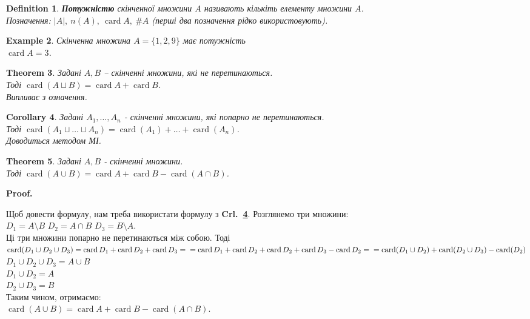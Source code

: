 \documentclass[a4paper, 14pt]{extarticle}
\makeatletter
\theoremstyle{theoremdd}
\newtheorem{theorem}{Theorem}[subsection]
\theoremstyle{theoremdd}
\newtheorem{definition}[theorem]{Definition}
\theoremstyle{theoremdd}
\theoremstyle{theoremdd}
\theoremstyle{theoremdd}
\newtheorem{example}[theorem]{Example}
\theoremstyle{theoremdd}
\theoremstyle{theoremdd}
\theoremstyle{theoremdd}
\theoremstyle{theoremdd}
\theoremstyle{theoremdd}
\theoremstyle{theoremdd}
\theoremstyle{theoremdd}
\theoremstyle{theoremdd}
\theoremstyle{theoremdd}
\newtheorem{corollary}[theorem]{Corollary}
\theoremstyle{theoremdd}
\renewenvironment{proof}[1][Proof.\\]{\par
\pushQED{\hfill \qed}%
\normalfont \topsep6\p@\@plus6\p@\relax
\trivlist
\item\relax
{\bfseries
#1\@addpunct{.}}\hspace\labelsep\ignorespaces
}{%
\popQED\endtrivlist\@endpefalse
}
\DeclareMathOperator{\card}{card}
\newcommand\crlref[1]{\textbf{Crl.~\ref{#1}}}
\makeatother
\begin{document}
\begin{definition}
\textbf{Потужністю} скінченної множини $A$ називають кількіть елементу множини $A$.\\
Позначення: $|A|,\ n(A),\ \card A,\ \#A$ (перші два позначення рідко використовують).
\end{definition}

\begin{example}
Скінченна множина $A = \{1,2,9\}$ має потужність \\ $\card A = 3$.
\end{example}

\begin{theorem}
Задані $A,B$ -- скінченні множини, які не перетинаються.\\
Тоді $\card(A \sqcup B) = \card A + \card B$.\\
\textit{Випливає з означення.}
\end{theorem}

\begin{corollary}
\label{crl:cardinality_of_union_of_non_intersecting_sets}
Задані $A_1,\dots,A_n$ - скінченні множини, які попарно не перетинаються.\\
Тоді $\card(A_1 \sqcup \dots \sqcup A_n) = \card(A_1) + \dots + \card(A_n)$.\\
\textit{Доводиться методом МІ.}
\end{corollary}

\begin{theorem}
Задані $A,B$ - скінченні множини.\\
Тоді $\card(A \cup B) = \card A + \card B - \card(A \cap B)$.
\end{theorem}

\begin{proof}
Щоб довести формулу, нам треба використати формулу з \crlref{crl:cardinality_of_union_of_non_intersecting_sets}.
Розглянемо три множини:\\
$D_1 = A \setminus B$ \qquad $D_2 = A \cap B$ \qquad $D_3 = B \setminus A$.\\
Ці три множини попарно не перетинаються між собою. Тоді\\
$\card(D_1 \cup D_2 \cup D_3) = \card D_1 + \card D_2 + \card D_3 = \\ = \card D_1 + \card D_2 + \card D_2 + \card D_3 - \card D_2 = \\ =\card(D_1 \cup D_2) + \card(D_2 \cup D_3) - \card(D_2)$\\
$D_1 \cup D_2 \cup D_3 = A \cup B$\\
$D_1 \cup D_2 = A$\\
$D_2 \cup D_3 = B$\\
Таким чином, отримаємо:\\
$\card(A \cup B) = \card A + \card B - \card(A \cap B)$.
\end{proof}
\end{document}
